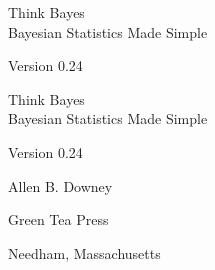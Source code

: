 \documentclass[12pt]{book}
\newcommand{\theversion}{0.24}
\begin{document}
\begin{latexonly}

\renewcommand{\blankpage}{\thispagestyle{empty} \quad \newpage}


\thispagestyle{empty}

\begin{flushright}
\vspace*{2.0in}

\begin{spacing}{3}
{\huge Think Bayes}\\
{\Large Bayesian Statistics Made Simple}
\end{spacing}

\vspace{0.25in}

Version \theversion

\vfill

\end{flushright}


\blankpage
\blankpage

\pagebreak
\thispagestyle{empty}

\begin{flushright}
\vspace*{2.0in}

\begin{spacing}{3}
{\huge Think Bayes}\\
{\Large Bayesian Statistics Made Simple}
\end{spacing}

\vspace{0.25in}

Version \theversion

\vspace{1in}


{\Large
Allen B. Downey\\
}


\vspace{0.5in}

{\Large Green Tea Press}

{\small Needham, Massachusetts}

\vfill

\end{flushright}


\pagebreak
\thispagestyle{empty}


\end{latexonly}
\end{document}
